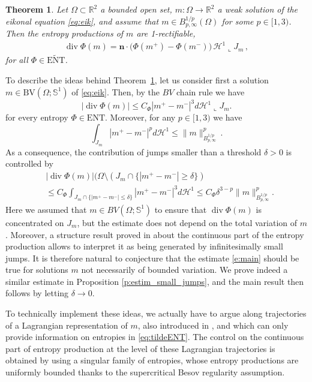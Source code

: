 \documentclass[fleqn
]{article}
\numberwithin{equation}{section}
\newcommand{\R}{{\mathbb R}}
\newcommand{\BV}{{\mathrm{BV}}}
\DeclareMathOperator{\dv}{div}
\newtheorem{thm}{Theorem}[section]
\theoremstyle{definition}
\begin{document}
\begin{thm}\label{t:rectif}
Let $\Omega\subset\R^2$ a bounded open set,  $m\colon \Omega\to\mathbb R^2$
a weak solution of the eikonal equation
 \eqref{eq:eik}, 
and assume that
 $m\in B^{  1/p}_{p,\infty}(\Omega)$ for some $p\in [1,3)$.
 Then the entropy productions of $m$ are 1-rectifiable,
 \begin{align*}
 \dv\Phi(m) = \mathbf n\cdot \big(\Phi(m^+)-\Phi(m^-) \big) \,\mathcal H^1 \llcorner J_m\,,
 \end{align*}
 for all $\Phi\in\widetilde{\mathrm{ENT}}$.
\end{thm} 


\medskip

To describe the ideas behind Theorem~\ref{t:rectif},
let us consider first a solution $m\in \BV(\Omega;\mathbb S^1)$ of \eqref{eq:eik}.
Then, by the $BV$ chain rule we have
\[
|\dv \Phi(m)| \le C_\Phi |m^+-m^-|^3d \mathcal H^1\llcorner J_m.
\] 
for every entropy $\Phi \in \mathrm{ENT}$.
Moreover, for any
$p\in [1,3)$ we have
\[
\int_{J_m}|m^+-m^-|^p d\mathcal H^1 \le \|m\|^p_{B^{1/p}_{p,\infty}}\,.
\]
As a consequence, the contribution of jumps smaller than
a threshold $\delta>0$ is controlled by
\begin{align}\label{e:main}
&
|\dv \Phi(m)| (\Omega \setminus  (J_m \cap  \{|m^+-m^-|\ge \delta\}) 
\nonumber
\\
& \leq  C_\Phi \int_{J_m \cap \{|m^+-m^-|\le \delta\}} |m^+-m^-|^3 d \mathcal H^1 
\leq  C_\Phi\delta^{3-p} \|m\|^p_{B^{1/p}_{p,\infty}}.
\end{align}
Here we assumed that $m\in BV(\Omega;\mathbb S^1)$
to ensure that $\dv \Phi(m)$ is concentrated on $J_m$,
 but the estimate does not depend on the total variation of $m$.
Moreover, 
a structure result 
 proved in \cite{marconi21ellipse}
about the continuous part of the entropy production
 allows to interpret it as being generated by infinitesimally small jumps.
It is therefore natural to conjecture that the estimate \eqref{e:main} should be true
for solutions $m$ not necessarily of bounded variation.
We prove indeed a similar estimate in
 Proposition \ref{p:estim_small_jumps}, 
 and the main result then follows by letting $\delta\to 0$. 


To technically implement these ideas, 
we actually have to argue along trajectories of a Lagrangian representation of $m$,
also introduced in \cite{marconi21ellipse}, 
and which can only provide information on entropies in \eqref{eq:tildeENT}.
The control on the continuous part of entropy production 
at the level of these Lagrangian trajectories
is obtained by using a singular family of entropies,
whose entropy productions are uniformly bounded thanks
to the supercritical Besov regularity assumption.
\end{document}
